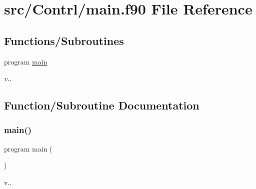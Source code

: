 \hypertarget{main_8f90}{}\section{src/\+Contrl/main.f90 File Reference}
\label{main_8f90}
\subsection*{Functions/\+Subroutines}
\begin{DoxyCompactItemize}
\item 
program \mbox{\hyperlink{main_8f90_a8ec2266d83cd6c0b762cbcbc92c0af3d}{main}}
\begin{DoxyCompactList}\small\item\em v.. \end{DoxyCompactList}\end{DoxyCompactItemize}


\subsection{Function/\+Subroutine Documentation}
\mbox{\label{main_8f90_a8ec2266d83cd6c0b762cbcbc92c0af3d}} 
\subsubsection{\texorpdfstring{main()}{main()}}
{\footnotesize\ttfamily program main (\begin{DoxyParamCaption}{ }\end{DoxyParamCaption})}



v.. 

